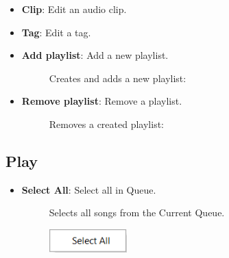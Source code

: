 \documentclass{article}
\begin{document}
\begin{itemize}
    \item \textbf{Clip}: Edit an audio clip.
    \item \textbf{Tag}: Edit a tag.
    \item \textbf{Add playlist}: Add a new playlist.
    \begin{description}
        \item[] Creates and adds a new playlist: 
    \end{description}
    \item \textbf{Remove playlist}: Remove a playlist.
        \begin{description}
        \item[] Removes a created playlist: 
    \end{description}
\end{itemize}

\subsection{Play}
    \begin{itemize}
    \item \textbf{Select All}: Select all in Queue.
        \begin{description}
        \item[] Selects all songs from the Current Queue.
        \item[] \includegraphics[width=3cm]{Images/Play Select All.png}
        \end{description}
    \end{itemize}
\end{document}
